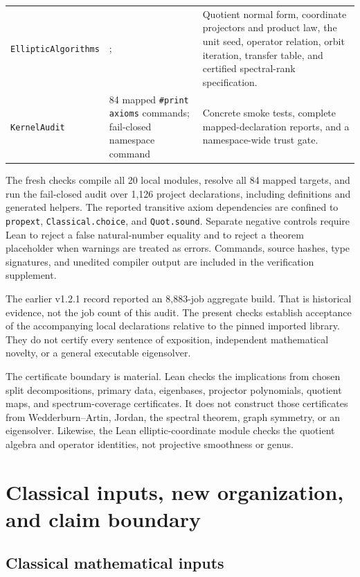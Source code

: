 \documentclass[11pt]{article}
\theoremstyle{definition}
\theoremstyle{remark}
\begin{document}
\begin{longtable}{L{0.24\textwidth}L{0.29\textwidth}L{0.36\textwidth}}
\texttt{EllipticAlgorithms}
& ; 
& Quotient normal form, coordinate projectors and product law, the unit seed, operator relation, orbit iteration, transfer table, and certified spectral-rank specification. \\
\texttt{KernelAudit}
& 84 mapped \texttt{\#print axioms} commands; fail-closed namespace command
& Concrete smoke tests, complete mapped-declaration reports, and a namespace-wide trust gate. \\
\bottomrule
\end{longtable}
\endgroup

The fresh checks compile all 20 local modules, resolve all 84 mapped
targets, and run the fail-closed audit over 1,126 project declarations,
including definitions and generated helpers. The reported transitive axiom
dependencies are confined to \texttt{propext}, \texttt{Classical.choice},
and \texttt{Quot.sound}. Separate negative controls require Lean to reject
a false natural-number equality and to reject a theorem placeholder when
warnings are treated as errors. Commands, source hashes, type signatures,
and unedited compiler output are included in the verification supplement.

The earlier v1.2.1 record reported an 8,883-job aggregate build. That is
historical evidence, not the job count of this audit. The present checks
establish acceptance of the accompanying local declarations relative to the
pinned imported library. They do not certify every sentence of exposition,
independent mathematical novelty, or a general executable eigensolver.

The certificate boundary is material. Lean checks the implications from chosen split decompositions, primary data, eigenbases, projector polynomials, quotient maps, and spectrum-coverage certificates. It does not construct those certificates from Wedderburn--Artin, Jordan, the spectral theorem, graph symmetry, or an eigensolver. Likewise, the Lean elliptic-coordinate module checks the quotient algebra and operator identities, not projective smoothness or genus.

\section{Classical inputs, new organization, and claim boundary}

\subsection{Classical mathematical inputs}
\end{document}
